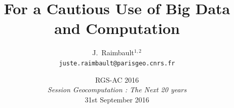 \documentclass[french,11pt]{beamer}
\begin{document}
\title{For a Cautious Use of Big Data and Computation}

\author{J.~Raimbault$^{1,2}$\\
\texttt{juste.raimbault@parisgeo.cnrs.fr}
}




\date{RGS-AC 2016\\\smallskip
\textit{Session Geocomputation : The Next 20 years}\\\smallskip
31st September 2016
}

\frame{\maketitle}











\end{document}
